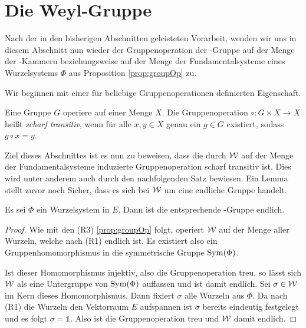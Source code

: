 \section{Die Weyl-Gruppe}
\label{sec:weylgroup}

Nach der in den bisherigen Abschnitten geleisteten Vorarbeit, wenden wir uns in diesem Abschnitt nun wieder der Gruppenoperation der \weyl\hyp{}Gruppe auf der Menge der \weyl\hyp{}Kammern beziehungsweise auf der Menge der Fundamentalsysteme eines Wurzelsystems $\Phi$ aus Proposition \ref{prop:groupOp} zu.

Wir beginnen mit einer für beliebige Gruppenoperationen definierten Eigenschaft.

\begin{defn}
  Eine Gruppe $G$ operiere auf einer Menge $X$.
  Die Gruppenoperation $\circ \colon G \times X \to X$ heißt \emph{scharf transitiv}, wenn für alle $x,y \in X$ genau ein $g \in G$ existiert, sodass $g \circ x = y$. 
\end{defn}

Ziel dieses Abschnittes ist es nun zu beweisen, dass die durch $\mathcal{W}$ auf der Menge der Fundamentalsysteme induzierte Gruppenoperation scharf transitiv ist.
Dies wird unter anderem auch durch den nachfolgenden Satz bewiesen.
Ein Lemma stellt zuvor noch Sicher, dass es sich bei $\mathcal{W}$ um eine endliche Gruppe handelt.

\begin{lem}
  \label{lem:weylFinite}
  Es sei $\Phi$ ein Wurzelsystem in $E$. Dann ist die entsprechende \weyl\hyp{}Gruppe endlich. 
\end{lem}

\begin{proof}
  Wie mit den (R3) \ref{prop:groupOp} folgt, operiert $\mathcal{W}$ auf der Menge aller Wurzeln, welche nach (R1) endlich ist.
  Es existiert also ein Gruppenhomomorphismus in die symmetrische Gruppe $\operatorname{Sym}(\Phi)$.

  Ist dieser Homomorphismus injektiv, also die Gruppenoperation treu, so lässt sich $\mathcal{W}$ als eine Untergruppe von $\operatorname{Sym}(\Phi)$ auffassen und ist damit endlich.
  Sei $\sigma \in \mathcal{W}$ im Kern dieses Homomorphismus.
  Dann fixiert $\sigma$ alle Wurzeln aus $\Phi$.
  Da nach (R1) die Wurzeln den Vektorraum $E$ aufspannen ist $\sigma$ bereits eindeutig festgelegt und es folgt $\sigma = \mathds{1}$.
  Also ist die Gruppenoperation treu und $\mathcal{W}$ damit endlich.
\end{proof}


